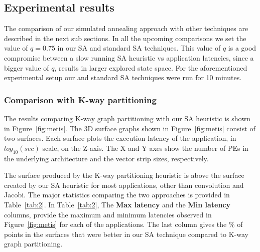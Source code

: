 \subsection{Experimental results}
\label{sec:results}

The comparison of our simulated annealing approach with other techniques
are described in the next sub sections. In all the upcoming comparisons
we set the value of $q=0.75$ in our SA and standard SA techniques. This
value of $q$ is a good compromise between a slow running SA heuristic vs
application latencies, since a bigger value of $q$, results in larger
explored state space. For the aforementioned experimental setup our and
standard SA techniques were run for 10 minutes.

\subsubsection{Comparison with K-way partitioning}
\label{sec:comparison-with-k}

The results comparing K-way graph partitioning with our SA heuristic is
shown in Figure~\ref{fig:metis}. The 3D surface graphs shown in
Figure~\ref{fig:metis} consist of two surfaces. Each surface plots the
execution latency of the application, in $log_{10}(sec)$ scale, on the
Z-axis. The X and Y axes show the number of PEs in the underlying
architecture and the vector strip sizes, respectively.

The surface produced by the K-way partitioning heuristic is above the
surface created by our SA heuristic for most applications, other than
convolution and Jacobi. The major statistics comparing the two
approaches is provided in Table~\ref{tab:2}. In Table~\ref{tab:2}, The
\textbf{Max latency} and the \textbf{Min latency} columns, provide the
maximum and minimum latencies observed in Figure~\ref{fig:metis} for
each of the applications. The last column gives the \% of points in the
surfaces that were better in our SA technique compared to K-way graph
partitioning.

